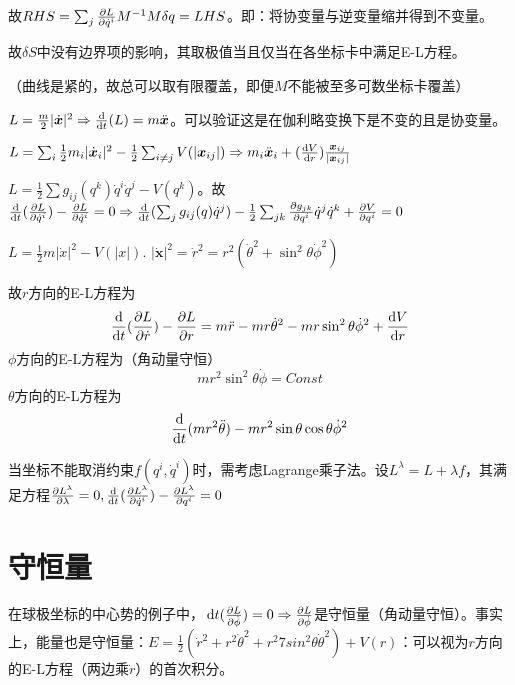 \documentclass{ctexbook}
\begin{document}
故$RHS=\sum_{j}\frac{\partial L}{\partial \dot q^{i}}M^{-1}M\delta q=LHS$。即：将协变量与逆变量缩并得到不变量。

故$\delta S$中没有边界项的影响，其取极值当且仅当在各坐标卡中满足E-L方程。

（曲线是紧的，故总可以取有限覆盖，即便$M$不能被至多可数坐标卡覆盖）

\begin{Eg}[伽利略时空中的自由粒子]
  $L=\frac{m}{2}|\dot{\bm x}|^{2}\Rightarrow \frac{\mathrm{d}}{\mathrm{d}t}(L)=m\ddot{\bm x}$。可以验证这是在伽利略变换下是不变的且是协变量。
\end{Eg}

\begin{Eg}
  $L=\sum_{i}\frac{1}{2}m_{i}|\dot{\bm{x}}_{i}|^{2}-\frac{1}{2}\sum_{i\neq j}V(|\bm{x}_{ij}|)\Rightarrow m_{i}\ddot{\bm{x}}_{i}+(\frac{\mathrm{d}V}{\mathrm{d}r})\frac{\bm x_{ij}}{|\bm x_{ij}|}$
\end{Eg}

\begin{Eg}[自然系统]
  $L=\frac{1}{2}\sum g_{ij}(q^{k})\dot q^{i}\dot q^{j}-V(q^{k})$。故$\frac{\mathrm{d}}{\mathrm{d}t}(\frac{\partial L}{\partial \dot q^{i}})-\frac{\partial L}{\partial \dot q^{i}}=0\Rightarrow \frac{\mathrm{d}}{\mathrm{d}t}(\sum_{j}g_{ij}(q)\dot q^{j})-\frac{1}{2}\sum_{jk}\frac{\partial g_{jk}}{\partial q^{i}}\dot q^{j}\dot q^{k}+\frac{\partial V}{\partial q^{i}}=0$
\end{Eg}

\begin{Eg}[球极坐标的中心势]
  $L=\frac{1}{2}m|\dot x|^{2}-V(|x|)$. $|\dot{\bm x}|^{2}=\dot r^{2}=r^{2}(\dot\theta^{2}+\sin^{2}\theta\dot\phi^{2})$

  故$r$方向的E-L方程为
  \[\frac{\mathrm{d}}{\mathrm{d}t}(\frac{\partial L}{\partial \dot r})-\frac{\partial L}{\partial r}=m\ddot r-mr\dot\theta^{2}-mr\sin^{2}\theta\dot\phi^{2}+\frac{\mathrm{d}V}{\mathrm{d}r}\]
  $\phi$方向的E-L方程为（角动量守恒）
  \[mr^{2}\sin^{2}\theta\dot\phi=Const\]
  $\theta$方向的E-L方程为
  \[\frac{\mathrm{d}}{\mathrm{d}t}(mr^{2}\ddot \theta)-mr^{2}\sin\theta\cos\theta\dot{\phi}^{2}\]
\end{Eg}

当坐标不能取消约束$f(q^{i},\dot q^{i})$时，需考虑Lagrange乘子法。设$L^{\lambda}=L+\lambda f$，其满足方程$\frac{\partial L^{\lambda}}{\partial \lambda}=0,\frac{\mathrm{d}}{\mathrm{d}t}(\frac{\partial L^{\lambda}}{\partial \dot q^{i}})-\frac{\partial L^{\lambda}}{\partial q^{i}}=0$

\section{守恒量}
在球极坐标的中心势的例子中，$\,\mathrm{d}{}{t}(\frac{\partial L}{\partial \dot\phi})=0\Rightarrow \frac{\partial L}{\partial \dot{\phi}}$是守恒量（角动量守恒）。事实上，能量也是守恒量：$E=\frac{1}{2}(\dot{r}^{2}+r^{2}\dot{\theta}^{2}+r^{2}7sin^{2}\theta{\dot\theta}^{2})+V(r)$：可以视为$r$方向的E-L方程（两边乘$\dot{r}$）的首次积分。
\end{document}

